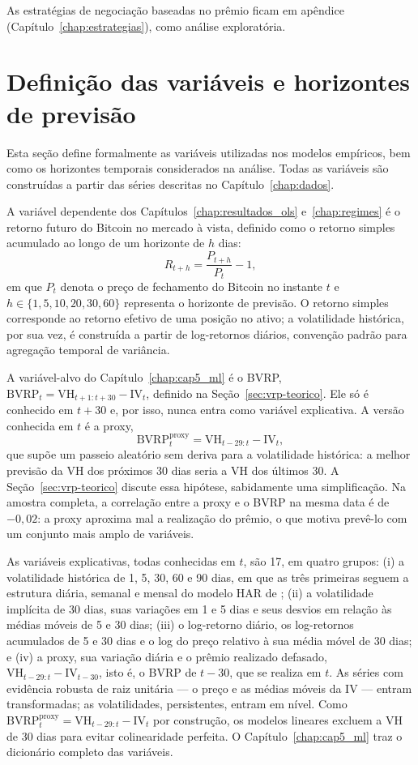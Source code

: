 As estratégias de negociação baseadas no prêmio ficam em apêndice
(Capítulo~\ref{chap:estrategias}), como análise exploratória.

\section{Definição das variáveis e horizontes de previsão}
\label{sec:variaveis_horizontes}

Esta seção define formalmente as variáveis utilizadas nos modelos empíricos,
bem como os horizontes temporais considerados na análise. Todas as variáveis
são construídas a partir das séries descritas no Capítulo~\ref{chap:dados}.

A variável dependente dos Capítulos~\ref{chap:resultados_ols}
e~\ref{chap:regimes} é o retorno futuro do Bitcoin no mercado à vista, definido
como o retorno simples acumulado ao longo de um horizonte de $h$ dias:
\[
R_{t+h} = \frac{P_{t+h}}{P_t} - 1,
\]
em que $P_t$ denota o preço de fechamento do Bitcoin no instante $t$ e
$h \in \{1, 5, 10, 20, 30, 60\}$ representa o horizonte de previsão. O retorno
simples corresponde ao retorno efetivo de uma posição no ativo; a volatilidade
histórica, por sua vez, é construída a partir de log-retornos diários,
convenção padrão para agregação temporal de variância.

A variável-alvo do Capítulo~\ref{chap:cap5_ml} é o BVRP,
$\text{BVRP}_t = \text{VH}_{t+1:t+30} - \text{IV}_t$, definido na
Seção~\ref{sec:vrp-teorico}. Ele só é conhecido em $t+30$ e, por isso, nunca
entra como variável explicativa. A versão conhecida em $t$ é a proxy,
\[
\text{BVRP}^{\text{proxy}}_t = \text{VH}_{t-29:t} - \text{IV}_t,
\]
que supõe um passeio aleatório sem deriva para a volatilidade histórica: a
melhor previsão da VH dos próximos 30 dias seria a VH dos últimos 30. A
Seção~\ref{sec:vrp-teorico} discute essa hipótese, sabidamente uma
simplificação. Na amostra completa, a correlação entre a proxy e o BVRP na
mesma data é de $-0{,}02$: a proxy aproxima mal a realização do prêmio, o que
motiva prevê-lo com um conjunto mais amplo de variáveis.

As variáveis explicativas, todas conhecidas em $t$, são 17, em quatro grupos:
(i) a volatilidade histórica de 1, 5, 30, 60 e 90 dias, em que as três
primeiras seguem a estrutura diária, semanal e mensal do modelo HAR de
\citet{corsi2009har}; (ii) a volatilidade implícita de 30 dias, suas variações
em 1 e 5 dias e seus desvios em relação às médias móveis de 5 e 30 dias;
(iii) o log-retorno diário, os log-retornos acumulados de 5 e 30 dias e o log
do preço relativo à sua média móvel de 30 dias; e (iv) a proxy, sua variação
diária e o prêmio realizado defasado,
$\text{VH}_{t-29:t} - \text{IV}_{t-30}$, isto é, o BVRP de $t-30$, que se
realiza em $t$. As séries com evidência robusta de raiz unitária --- o preço e
as médias móveis da IV --- entram transformadas; as volatilidades, persistentes,
entram em nível. Como $\text{BVRP}^{\text{proxy}}_t = \text{VH}_{t-29:t} -
\text{IV}_t$ por construção, os modelos lineares excluem a VH de 30 dias para
evitar colinearidade perfeita. O Capítulo~\ref{chap:cap5_ml} traz o dicionário
completo das variáveis.

